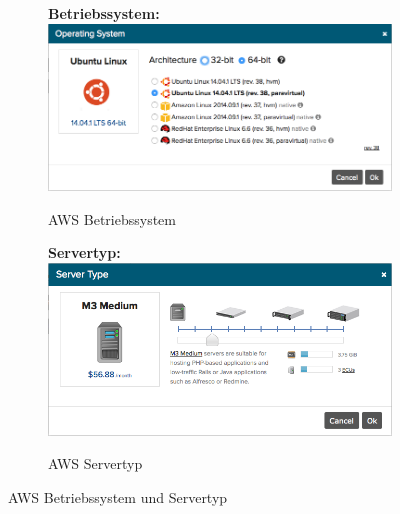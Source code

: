\begin{figure}[!htbp]
  \centering
\begin{subfigure}[b]{.49\textwidth}
\textbf{Betriebssystem:}
\includegraphics[width=\textwidth]{./03_Analyse/03_Bitnami/images/aws_operating_system}
\caption{AWS Betriebssystem}
\end{subfigure}
  \hfill
\begin{subfigure}[b]{.49\textwidth}
\textbf{Servertyp:}\\
\includegraphics[width=\textwidth]{./03_Analyse/03_Bitnami/images/aws_servertype}
\caption{AWS Servertyp}
\end{subfigure}
\caption{AWS Betriebssystem und Servertyp}
\end{figure}

